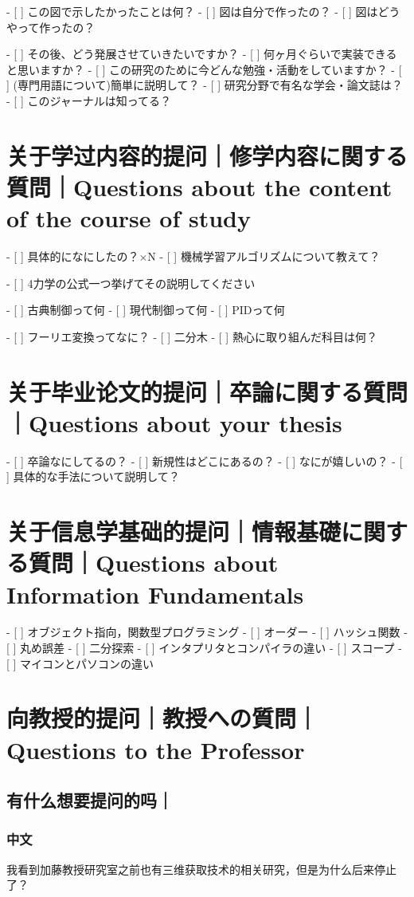 \documentclass[lang=cn,11pt,a4paper]{elegantpaper}
\begin{document}
- [ ]  この図で示したかったことは何？
- [ ]  図は自分で作ったの？
- [ ]  図はどうやって作ったの？


- [ ]  その後、どう発展させていきたいですか？
- [ ]  何ヶ月ぐらいで実装できると思いますか？
- [ ]  この研究のために今どんな勉強・活動をしていますか？
- [ ]  (専門用語について)簡単に説明して？
- [ ]  研究分野で有名な学会・論文誌は？
- [ ]  このジャーナルは知ってる？


\section{关于学过内容的提问｜修学内容に関する質問｜Questions about the content of the course of study}


- [ ]  具体的になにしたの？×N
- [ ]  機械学習アルゴリズムについて教えて？


- [ ]  4力学の公式一つ挙げてその説明してください


- [ ]  古典制御って何
- [ ]  現代制御って何
- [ ]  PIDって何


- [ ]  フーリエ変換ってなに？
- [ ]  二分木
- [ ]  熱心に取り組んだ科目は何？

\section{关于毕业论文的提问｜卒論に関する質問｜Questions about your thesis}
- [ ]  卒論なにしてるの？
- [ ]  新規性はどこにあるの？
- [ ]  なにが嬉しいの？
- [ ]  具体的な手法について説明して？

\section{关于信息学基础的提问｜情報基礎に関する質問｜Questions about Information Fundamentals}


- [ ]  オブジェクト指向，関数型プログラミング
- [ ]  オーダー
- [ ]  ハッシュ関数
- [ ]  丸め誤差
- [ ]  二分探索
- [ ]  インタプリタとコンパイラの違い
- [ ]  スコープ
- [ ]  マイコンとパソコンの違い
\section{向教授的提问｜教授への質問｜Questions to the Professor}
\subsection{有什么想要提问的吗｜}
\subsubsection{中文}
我看到加藤教授研究室之前也有三维获取技术的相关研究，但是为什么后来停止了？
\end{document}
